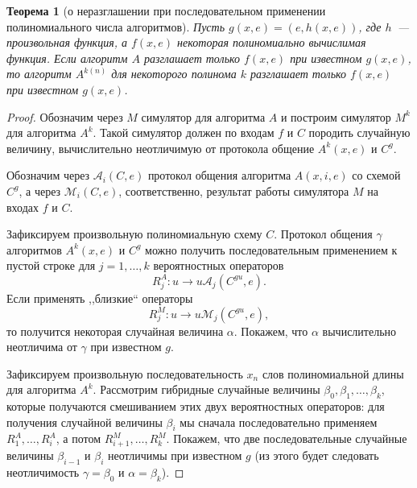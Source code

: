 \documentclass[12pt,a4paper]{article}
\theoremstyle{definition}
\theoremstyle{plain}
\newtheorem{theorem}{Теорема}[section]
\theoremstyle{remark}
\begin{document}
\begin{theorem}[о неразглашении при последовательном применении полиномиального числа алгоритмов]
\label{thm:knowledge-poly-repetition}
Пусть $g(x,e) = (e, h(x,e))$, где $h$~--- произвольная функция, а $f(x,e)$ некоторая полиномиально
вычислимая функция. Если алгоритм $A$ разглашает только $f(x,e)$ при известном $g(x,e)$,
то алгоритм $A^{k(n)}$ для некоторого полинома $k$ разглашает только $f(x,e)$ при известном $g(x,e)$.
\end{theorem}
\begin{proof}
Обозначим через $M$ симулятор для алгоритма $A$ и построим симулятор $M^k$ для алгоритма $A^k$. Такой симулятор должен по входам $f$ и $C$ породить случайную величину, вычислительно неотличимую от протокола общение $A^k(x,e)$ и $C^g$.

Обозначим через $\mathcal{A}_i(C,e)$ протокол общения алгоритма $A(x,i,e)$ 
со схемой $C^g$, а через $\mathcal{M}_i(C,e)$, соответственно, 
результат работы симулятора $M$ на входах $f$ и $C$.

Зафиксируем произвольную полиномиальную схему $C$. Протокол общения $\gamma$ алгоритмов
$A^k(x,e)$ и $C^g$ можно получить последовательным применением к пустой строке для 
$j=1,\dotsc,k$ вероятностных операторов 
$$
R^A_j: u\to u\mathcal A_j(C^{gu}, e).
$$
Если применять ,,близкие`` операторы
$$
R^M_j: u\to u\mathcal M_j(C^{gu}, e),
$$
то получится некоторая случайная величина $\alpha$. Покажем, что $\alpha$
вычислительно неотличима от $\gamma$ при известном $g$.

Зафиксируем произвольную последовательность $x_n$ слов 
полиномиальной длины для алгоритма $A^k$.
Рассмотрим гибридные случайные величины $\beta_0,\beta_1,\dotsc,\beta_k$, которые
получаются смешиванием этих двух вероятностных операторов: для получения случайной величины 
$\beta_i$ мы сначала последовательно применяем $R^A_1, \dotsc, R^A_i$, а потом 
$R^M_{i+1}, \dotsc, R^M_k$.
Покажем, что две последовательные случайные величины $\beta_{i-1}$ и $\beta_{i}$
неотличимы при известном $g$ (из этого будет следовать неотличимость $\gamma=\beta_0$ и $\alpha=\beta_k$).


\end{proof}
\end{document}
